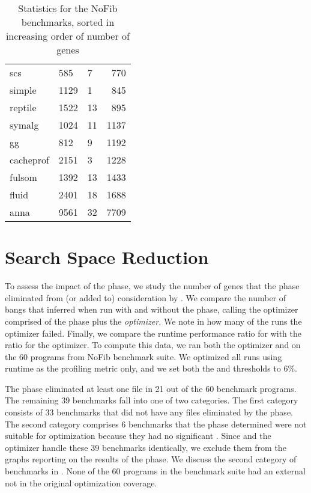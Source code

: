 \begin{table}[!htb]
\begin{minipage}{.5\linewidth}
\begin{tabular}{lllr}
            scs         &   585 &   7   &   770\\
            simple      &   1129&   1   &   845\\
            reptile     &   1522&   13  &   895\\
            symalg      &   1024&   11  &   1137\\
            gg          &   812 &   9   &   1192\\
            cacheprof   &   2151&   3   &   1228\\
            fulsom      &   1392&   13  &   1433\\
            fluid       &   2401&   18  &   1688\\
            anna        &   9561&   32  &   7709\\
        \end{tabular}
    \end{minipage} 
    \caption{Statistics for the NoFib benchmarks, sorted in increasing order of number of genes}
\label{tab:nofib-list}
\end{table}


\section{\Preopt{} Search Space Reduction}

To assess the impact of the \preopt{} phase, we study the number of
genes that the phase eliminated from (or added to) consideration by \Ao{}.
We compare the number of bangs that \Ao{} inferred when run with and
without the \preopt{} phase, calling the optimizer comprised of
the \preopt{} phase plus \Ao{} the \textit{\Preopt{} optimizer.} We
note in how many of the runs the \Preopt{} optimizer failed.  Finally,
we compare the runtime performance ratio for \Ao{} with the ratio for
the \Preopt{} optimizer.
To compute this data, we ran both the \Preopt{} optimizer and \Ao{} on
the 60 programs from NoFib benchmark suite.  We optimized all runs 
using runtime as the profiling metric only, and we set both 
the \hotspotcost{} and \absim{} thresholds to 6\%.

The \preopt{} phase eliminated at least one file in 21 out of the 60 
benchmark programs.
The remaining 39 benchmarks fall into one of two categories.
The first category consists of 33 benchmarks that did not have any files
eliminated by the \preopt{} phase. The second category comprises
6 benchmarks that the \preopt{} phase determined were not suitable for
optimization because they had no significant \hotspots{}.
Since \Ao{} and the \Preopt{} optimizer handle these 39 benchmarks
identically, we exclude them from the graphs reporting on the results
of the \preopt{} phase. We discuss the second category of benchmarks in
. None of the 60 programs in the benchmark suite
had an external \hotspot{} not in the original optimization coverage.

